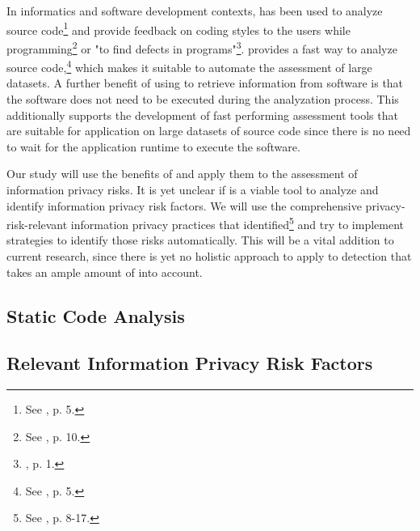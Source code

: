 In informatics and software development contexts, \sca has been used to analyze source code\footnote{See \cite{Haris2014}, p.  5.} and provide feedback on coding styles to the users while programming\footnote{See \cite{Bardas2010}, p. 10.} or "to find defects in programs"\footnote{\cite{Bardas2010}, p. 1.}.
\Sca provides a fast way to analyze source code,\footnote{See \cite{Bardas2010}, p. 5.} which makes it suitable to automate the assessment of large datasets.
A further benefit of using \sca to retrieve information from software is that the software does not need to be executed during the analyzation process.
This additionally supports the development of fast performing assessment tools that are suitable for application on large datasets of source code since there is no need to wait for the application runtime to execute the software.

Our study will use the benefits of \sca and apply them to the assessment of \mH information privacy risks.
It is yet unclear if \sca is a viable tool to analyze and identify information privacy risk factors.
We will use the comprehensive privacy-risk-relevant information privacy practices that \cite{Dehling2016} identified\footnote{See \cite{Dehling2016}, p. 8-17.} and try to implement \sca strategies to identify those risks automatically.
This will be a vital addition to current research, since there is yet no holistic approach to apply \sca to \ipr detection that takes an ample amount of \iprfs into account.

\subsection{Static Code Analysis}


\subsection{Relevant Information Privacy Risk Factors}\label{chapter:Relevant}


